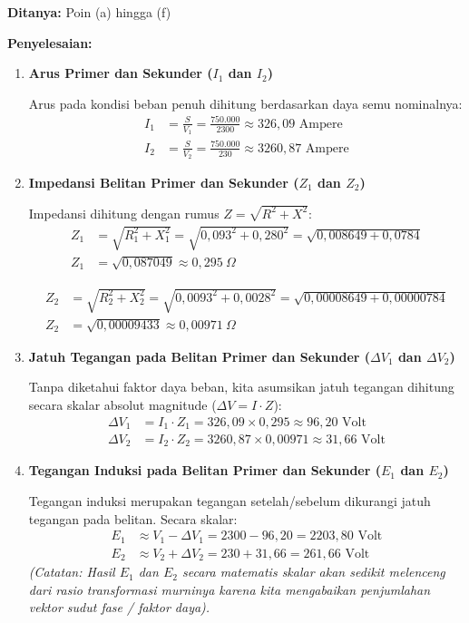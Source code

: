 \documentclass[12pt, a4paper]{article}
\begin{document}
\textbf{Ditanya:} Poin (a) hingga (f)

\textbf{Penyelesaian:}

\begin{enumerate}[label=\alph*.]
    \item \textbf{Arus Primer dan Sekunder ($I_1$ dan $I_2$)}

    Arus pada kondisi beban penuh dihitung berdasarkan daya semu nominalnya:
    \begin{align*}
        I_1 &= \frac{S}{V_1} = \frac{750.000}{2300} \approx 326,09 \text{ Ampere} \\
        I_2 &= \frac{S}{V_2} = \frac{750.000}{230} \approx 3260,87 \text{ Ampere}
    \end{align*}

    \item \textbf{Impedansi Belitan Primer dan Sekunder ($Z_1$ dan $Z_2$)}

    Impedansi dihitung dengan rumus $Z = \sqrt{R^2 + X^2}$:
    \begin{align*}
        Z_1 &= \sqrt{R_1^2 + X_1^2} = \sqrt{0,093^2 + 0,280^2} = \sqrt{0,008649 + 0,0784} \\
        Z_1 &= \sqrt{0,087049} \approx 0,295 \ \Omega
    \end{align*}

    \begin{align*}
        Z_2 &= \sqrt{R_2^2 + X_2^2} = \sqrt{0,0093^2 + 0,0028^2} = \sqrt{0,00008649 + 0,00000784} \\
        Z_2 &= \sqrt{0,00009433} \approx 0,00971 \ \Omega
    \end{align*}

    \item \textbf{Jatuh Tegangan pada Belitan Primer dan Sekunder ($\Delta V_1$ dan $\Delta V_2$)}

    Tanpa diketahui faktor daya beban, kita asumsikan jatuh tegangan dihitung secara skalar absolut magnitude ($\Delta V = I \cdot Z$):
    \begin{align*}
        \Delta V_1 &= I_1 \cdot Z_1 = 326,09 \times 0,295 \approx 96,20 \text{ Volt} \\
        \Delta V_2 &= I_2 \cdot Z_2 = 3260,87 \times 0,00971 \approx 31,66 \text{ Volt}
    \end{align*}

    \item \textbf{Tegangan Induksi pada Belitan Primer dan Sekunder ($E_1$ dan $E_2$)}

    Tegangan induksi merupakan tegangan setelah/sebelum dikurangi jatuh tegangan pada belitan. Secara skalar:
    \begin{align*}
        E_1 &\approx V_1 - \Delta V_1 = 2300 - 96,20 = 2203,80 \text{ Volt} \\
        E_2 &\approx V_2 + \Delta V_2 = 230 + 31,66 = 261,66 \text{ Volt}
    \end{align*}
    \textit{(Catatan: Hasil $E_1$ dan $E_2$ secara matematis skalar akan sedikit melenceng dari rasio transformasi murninya karena kita mengabaikan penjumlahan vektor sudut fase / faktor daya).}


\end{enumerate}
\end{document}
